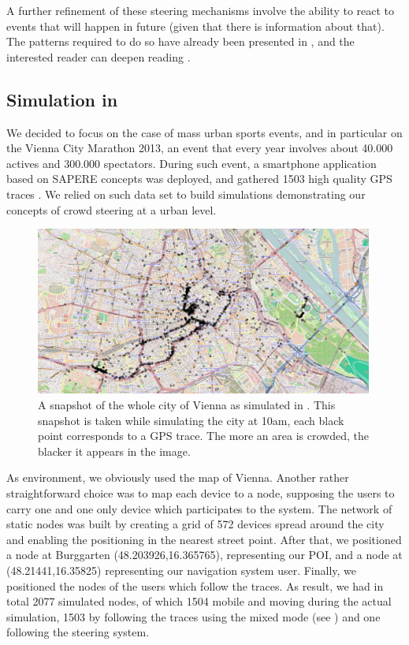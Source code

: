 \documentclass[12pt,a4paper,twoside,openright]{book}
\begin{document}
A further refinement of these steering mechanisms involve the ability to react to events that will happen in future (given that there is information about that).
%
The patterns required to do so have already been presented in , and the interested reader can deepen reading \cite{anticipativegradient-SASO12}.

\subsection{Simulation in \alchemist{}}
\label{ahpc-simulation}
We decided to focus on the case of mass urban sports events, and in particular on the Vienna City Marathon 2013, an event that every year involves about 40.000 actives and 300.000 spectators.
%
During such event, a smartphone application based on SAPERE \cite{sapere-procedia7} concepts was deployed, and gathered 1503 high quality GPS traces \cite{socinfo2013}.
%
We relied on such data set to build simulations demonstrating our concepts of crowd steering at a urban level.

\begin{figure}[h]
 \includegraphics[width=0.99\textwidth]{img/vienna}
  \caption{A snapshot of the whole city of Vienna as simulated in \alchemist{}. This snapshot is taken while simulating the city at 10am, each black point corresponds to a GPS trace. The more an area is crowded, the blacker it appears in the image.}
  \label{img:ahpc-vienna}
\end{figure}

As \alchemist{} environment, we obviously used the map of Vienna.
%
Another rather straightforward choice was to map each device to a node, supposing the users to carry one and one only device which participates to the system.
%
The network of static nodes was built by creating a grid of 572 devices spread around the city and enabling the positioning in the nearest street point.
%
After that, we positioned a node at Burggarten (48.203926,16.365765), representing our POI, and a node at (48.21441,16.35825) representing our navigation system user.
%
Finally, we positioned the nodes of the users which follow the traces.
%
As result, we had in total 2077 simulated nodes, of which 1504 mobile and moving during the actual simulation, 1503 by following the traces using the mixed mode (see ) and one following the steering system.
\end{document}
